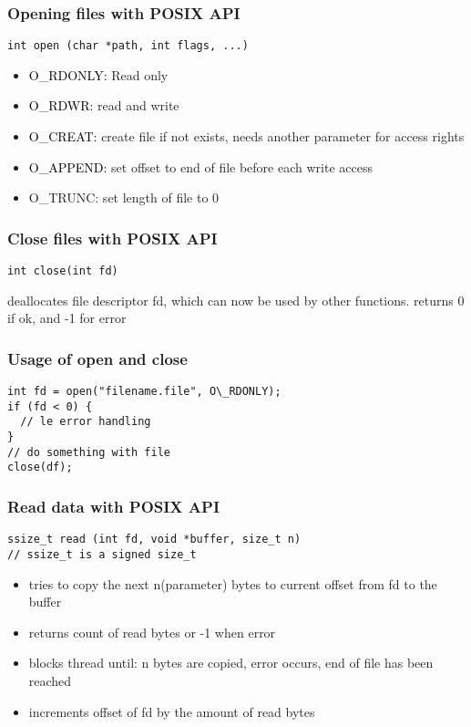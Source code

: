 \documentclass[main.tex,fontsize=8pt,paper=a4,paper=portrait,DIV=calc,]{scrartcl}
\begin{document}
\subsubsection{Opening files with POSIX API}
\begin{lstlisting}
int open (char *path, int flags, ...)
\end{lstlisting}
\begin{itemize}
\item \textcolor{black}{O\_RDONLY:} Read only
\item \textcolor{black}{O\_RDWR:} read and write
\item \textcolor{black}{O\_CREAT:} create file if not exists, needs another parameter for access rights
\item \textcolor{black}{O\_APPEND:} set offset to end of file before each write access
\item O\_TRUNC: set length of file to 0
\end{itemize} 

\subsubsection{Close files with POSIX API}
\begin{lstlisting}
int close(int fd)
\end{lstlisting}
deallocates file descriptor fd, which can now be used by other functions.\newline
returns 0 if ok, and -1 for error

\subsubsection{Usage of open and close}
\begin{lstlisting}
int fd = open("filename.file", O\_RDONLY);
if (fd < 0) {
  // le error handling
}
// do something with file
close(df);
\end{lstlisting}

\subsubsection{Read data with POSIX API}
\begin{lstlisting}
ssize_t read (int fd, void *buffer, size_t n)
// ssize_t is a signed size_t
\end{lstlisting}
\begin{itemize}
  \item tries to copy the next n(parameter) bytes to current offset from fd to the buffer 
\item returns count of read bytes or -1 when error
\item blocks thread until: n bytes are copied, error occurs, end of file has been reached
\item increments offset of fd by the amount of read bytes
\end{itemize} 
\end{document}
